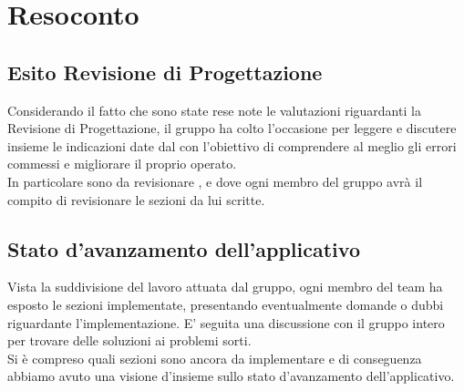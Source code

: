 \section{Resoconto}
\subsection{Esito Revisione di Progettazione} 
Considerando il fatto che sono state rese note le valutazioni riguardanti la Revisione di Progettazione, il gruppo ha colto l'occasione per leggere e discutere insieme le indicazioni date dal  \VT{} con l'obiettivo di comprendere al meglio gli errori commessi e migliorare il proprio operato. \\
In particolare sono da revisionare \NdP, \AdR{} e \PdP{} dove ogni membro del gruppo avrà il compito di revisionare le sezioni da lui scritte.

\subsection{Stato d'avanzamento dell'applicativo}
Vista la suddivisione del lavoro attuata dal gruppo, ogni membro del team ha esposto le sezioni implementate, presentando eventualmente domande o dubbi  riguardante l'implementazione. E' seguita una discussione con il gruppo intero per trovare delle soluzioni ai problemi sorti.\\
Si è compreso quali sezioni sono ancora da implementare e di conseguenza abbiamo avuto una visione d'insieme sullo stato d'avanzamento dell'applicativo.
